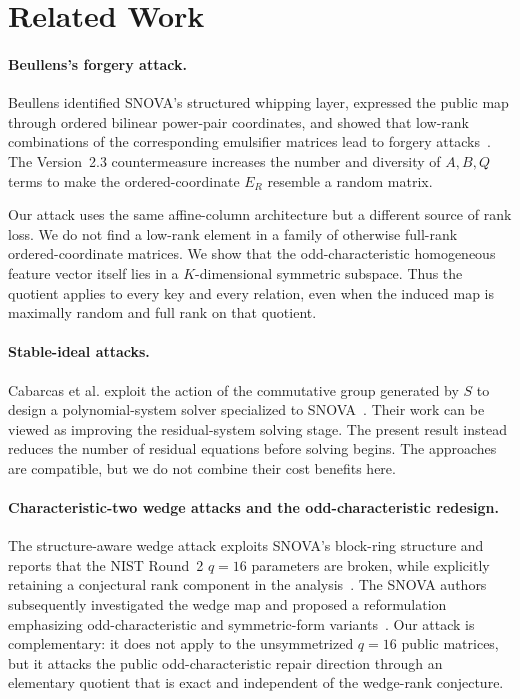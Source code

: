 \documentclass[runningheads]{llncs}
\newcommand{\SNOVA}{\textsf{SNOVA}}
\begin{document}
\section{Related Work}\label{sec:related}

\paragraph{Beullens's forgery attack.}
Beullens identified \SNOVA{}'s structured whipping layer, expressed the public map through ordered bilinear power-pair coordinates, and showed that low-rank combinations of the corresponding emulsifier matrices lead to forgery attacks~\cite{Beullens2024SNOVA}.  The Version~2.3 countermeasure increases the number and diversity of $A,B,Q$ terms to make the ordered-coordinate $E_R$ resemble a random matrix.

Our attack uses the same affine-column architecture but a different source of rank loss.  We do not find a low-rank element in a family of otherwise full-rank ordered-coordinate matrices.  We show that the odd-characteristic homogeneous feature vector itself lies in a $K$-dimensional symmetric subspace.  Thus the quotient applies to every key and every relation, even when the induced map is maximally random and full rank on that quotient.

\paragraph{Stable-ideal attacks.}
Cabarcas et al. exploit the action of the commutative group generated by $S$ to design a polynomial-system solver specialized to \SNOVA{}~\cite{Cabarcas2025SNOVA}.  Their work can be viewed as improving the residual-system solving stage.  The present result instead reduces the number of residual equations before solving begins.  The approaches are compatible, but we do not combine their cost benefits here.

\paragraph{Characteristic-two wedge attacks and the odd-characteristic redesign.}
The structure-aware wedge attack exploits \SNOVA{}'s block-ring structure and reports that the NIST Round~2 $q=16$ parameters are broken, while explicitly retaining a conjectural rank component in the analysis~\cite{BrosEtAl2026SNOVAWedge}.  The \SNOVA{} authors subsequently investigated the wedge map and proposed a reformulation emphasizing odd-characteristic and symmetric-form variants~\cite{TsengEtAl2026Wedge,DingEtAl2026Reformulating}.  Our attack is complementary: it does not apply to the unsymmetrized $q=16$ public matrices, but it attacks the public odd-characteristic repair direction through an elementary quotient that is exact and independent of the wedge-rank conjecture.
\end{document}
